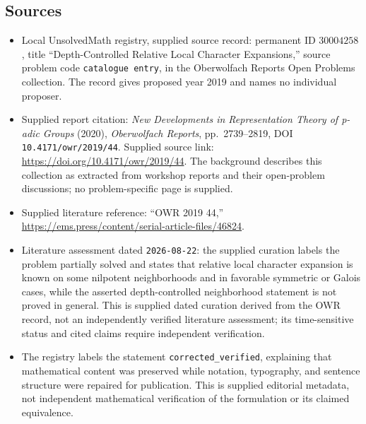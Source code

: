 \documentclass[11pt]{article}
\begin{document}
\subsection{Sources}
\begin{itemize}
\item Local UnsolvedMath registry, supplied source record: permanent ID \(30004258\), title ``Depth-Controlled Relative Local Character Expansions,'' source problem code \texttt{catalogue entry}, in the Oberwolfach Reports Open Problems collection. The record gives proposed year 2019 and names no individual proposer.
\item Supplied report citation: \emph{New Developments in Representation Theory of p-adic Groups} (2020), \emph{Oberwolfach Reports}, pp.\ 2739--2819, DOI \texttt{10.4171/owr/2019/44}. Supplied source link: \url{https://doi.org/10.4171/owr/2019/44}. The background describes this collection as extracted from workshop reports and their open-problem discussions; no problem-specific page is supplied.
\item Supplied literature reference: ``OWR 2019 44,'' \url{https://ems.press/content/serial-article-files/46824}.
\item Literature assessment dated \texttt{2026-08-22}: the supplied curation labels the problem partially solved and states that relative local character expansion is known on some nilpotent neighborhoods and in favorable symmetric or Galois cases, while the asserted depth-controlled neighborhood statement is not proved in general. This is supplied dated curation derived from the OWR record, not an independently verified literature assessment; its time-sensitive status and cited claims require independent verification.
\item The registry labels the statement \texttt{corrected\_verified}, explaining that mathematical content was preserved while notation, typography, and sentence structure were repaired for publication. This is supplied editorial metadata, not independent mathematical verification of the formulation or its claimed equivalence.
\end{itemize}
\end{document}
